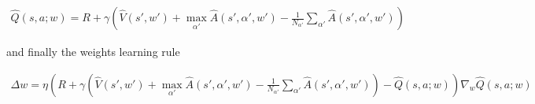 \documentclass[10pt,a4paper]{article}
\begin{document}
\begin{align}
  \hat{Q}(s, a; w) = R + \gamma \left( \hat{V}(s', w') + \max \limits_{\alpha'} \hat{A}(s', \alpha', w') - \frac{1}{N_{\alpha'}} \sum_{\alpha'} \hat{A}(s', \alpha', w') \right)
  \label{eq:ddqn}
\end{align}

and finally the weights learning rule

\begin{align}
  \Delta w = \eta \left( R + \gamma \left( \hat{V}(s', w') + \max \limits_{\alpha'} \hat{A}(s', \alpha', w') - \frac{1}{N_{\alpha'}} \sum_{\alpha'} \hat{A}(s', \alpha', w') \right) - \hat{Q}(s, a; w)\right) \nabla_w \hat{Q}(s, a; w)
  \label{eq:ddqn_w_update}
\end{align}
\end{document}
